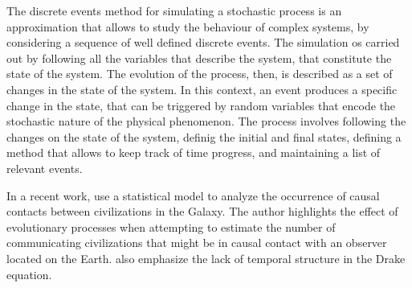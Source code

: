 \documentclass[crop]{CSLB}%
\begin{document}
The discrete events method for simulating a stochastic process is an
approximation that allows to study the behaviour of complex
systems, by considering a sequence of well defined discrete events.
%
The simulation os carried out by following all the variables that
describe the system, that constitute the state of the system.
%
The evolution of the process, then, is described as a set of changes
in the state of the system.
%
In this context, an event produces a specific change in the state,
that can be triggered by random variables that encode the stochastic
nature of the physical phenomenon.
%
The process involves following the changes on the state of the system,
definig the initial and final states, defining a method that allows to
keep track of time progress, and maintaining a list of relevant
events.


In a recent work, \citep{Balbi2018} use a statistical model to analyze
the occurrence of causal contacts between civilizations in the Galaxy.
%
The author highlights the effect of evolutionary processes when
attempting to estimate the number of communicating civilizations that
might be in causal contact with an observer located on the Earth.
%
\citet{cirkovic_temporal_2004} also emphasize the lack of temporal
structure in the Drake equation.



\end{document}
